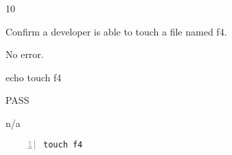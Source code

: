 \begin{description}[align=right,leftmargin=3.2cm,labelindent=3.0cm]
\item[Step:] 10
\item[Confirm:] Confirm a developer is able to touch a file named f4.
\item[Expectation:] No error.
\item[Command:] echo touch  f4
\item[Test Result:] PASS
\item[Evidence:] n/a
\end{description}
\begin{lstlisting}[numbers=left]
touch f4

\end{lstlisting}
